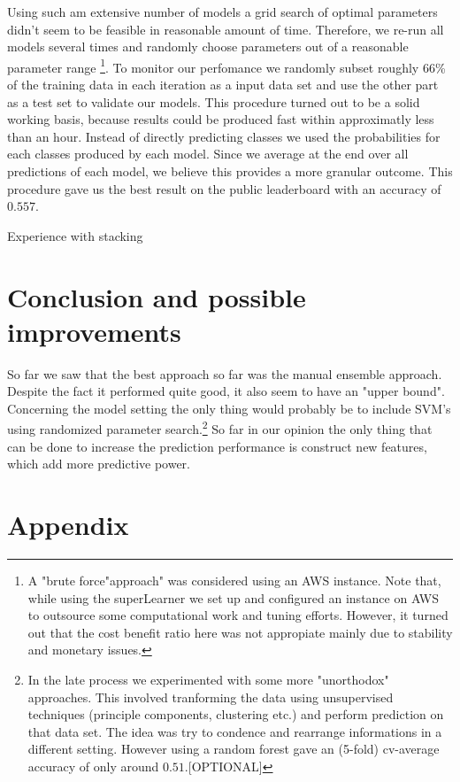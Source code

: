 \documentclass[fleqn]{article}
\begin{document}
Using such am extensive number of models a grid search of optimal parameters didn't seem to be feasible in reasonable amount of time. Therefore, we re-run all models several times and randomly choose parameters out of a reasonable parameter range \footnote{A "brute force"approach" was considered using an AWS instance. Note that, while using the superLearner we set up and configured an instance on AWS to outsource some computational work and tuning efforts. However, it turned out that the cost benefit ratio here was not appropiate mainly due to stability and monetary issues.}. To monitor our perfomance we randomly subset roughly 66\% of the training data in each iteration as a input data set and use the other part as a test set to validate our models. This procedure turned out to be a solid working basis, because results could be produced fast within approximatly less than an hour. 
Instead of directly predicting classes we used the probabilities for each classes produced by each model. Since we average at the end over all predictions of each model, we believe this provides a more granular outcome. This procedure gave us the best result on the public leaderboard with an accuracy of $0.557$. 

Experience with stacking

\section*{Conclusion and possible improvements}

So far we saw that the best approach so far was the manual ensemble approach. Despite the fact it performed quite good, it also seem to have an "upper bound". Concerning the model setting the only thing would probably be to include SVM's using randomized parameter search.\footnote{In the late process we experimented with some more "unorthodox" approaches. This involved tranforming the data using unsupervised techniques (principle components, clustering etc.) and perform prediction on that data set. The idea was try to condence and rearrange informations in a different setting. However using a random forest gave an (5-fold) cv-average accuracy of only around $0.51$.[OPTIONAL]}  So far in our opinion the only thing that can be done to increase the prediction performance is construct new features, which add more predictive power. 

\pagebreak

\section*{Appendix}
\end{document}
